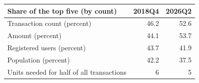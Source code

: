 \begin{tabular}{@{}l r r@{}}
\toprule
Share of the top five (by count) & 2018Q4 & 2026Q2 \\
\midrule
Transaction count (percent) & 46.2 & 52.6 \\
Amount (percent) & 44.1 & 53.7 \\
Registered users (percent) & 43.7 & 41.9 \\
Population (percent) & 42.2 & 37.5 \\
Units needed for half of all transactions & 6 & 5 \\
\bottomrule
\end{tabular}
